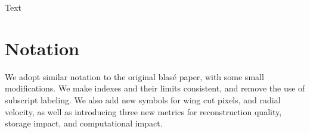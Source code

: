 \documentclass[twocolumn]{aastex631}
\begin{document}
\begin{acknowledgments}
    Text
\end{acknowledgments}

\break

\software{}


\clearpage

\appendix
\section{Notation}
We adopt similar notation to the original blas\'e paper, with some small modifications. We make indexes and
their limits consistent, and remove the use of subscript labeling. We also add new symbols for
wing cut pixels, and radial velocity, as well as introducing three new metrics for reconstruction quality,
storage impact, and computational impact.
\end{document}
